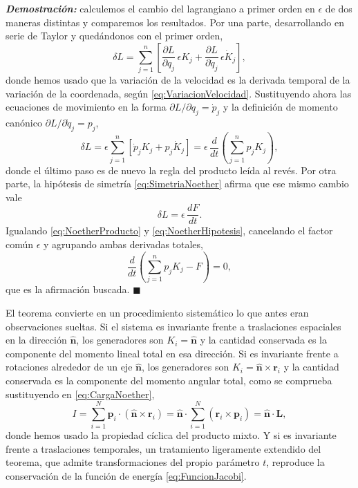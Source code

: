         \textbf{\textit{Demostración:}} calculemos el cambio del lagrangiano a primer orden en $\epsilon$ de dos maneras distintas y comparemos los resultados. Por una parte, desarrollando en serie de Taylor y quedándonos con el primer orden,
        \begin{equation}\label{eq:NoetherTaylor}
            \delta L = \sum_{j=1}^{n}\left[\frac{\partial L}{\partial q_{j}}\,\epsilon K_{j} + \frac{\partial L}{\partial\dot{q}_{j}}\,\epsilon\dot{K}_{j}\right],
        \end{equation}
        donde hemos usado que la variación de la velocidad es la derivada temporal de la variación de la coordenada, según \eqref{eq:VariacionVelocidad}. Sustituyendo ahora las ecuaciones de movimiento en la forma $\partial L/\partial q_{j} = \dot{p}_{j}$ y la definición de momento canónico $\partial L/\partial\dot{q}_{j} = p_{j}$,
        \begin{equation}\label{eq:NoetherProducto}
            \delta L = \epsilon\sum_{j=1}^{n}\left[\dot{p}_{j}K_{j} + p_{j}\dot{K}_{j}\right] = \epsilon\,\frac{d}{dt}\left(\sum_{j=1}^{n}p_{j}K_{j}\right),
        \end{equation}
        donde el último paso es de nuevo la regla del producto leída al revés. Por otra parte, la hipótesis de simetría \eqref{eq:SimetriaNoether} afirma que ese mismo cambio vale
        \begin{equation}\label{eq:NoetherHipotesis}
            \delta L = \epsilon\,\frac{dF}{dt} .
        \end{equation}
        Igualando \eqref{eq:NoetherProducto} y \eqref{eq:NoetherHipotesis}, cancelando el factor común $\epsilon$ y agrupando ambas derivadas totales,
        \begin{equation}\label{eq:NoetherFinal}
            \frac{d}{dt}\left(\sum_{j=1}^{n}p_{j}K_{j} - F\right) = 0,
        \end{equation}
        que es la afirmación buscada. $\blacksquare$

        El teorema convierte en un procedimiento sistemático lo que antes eran observaciones sueltas. Si el sistema es invariante frente a traslaciones espaciales en la dirección $\hat{\mathbf{n}}$, los generadores son $K_{i} = \hat{\mathbf{n}}$ y la cantidad conservada es la componente del momento lineal total en esa dirección. Si es invariante frente a rotaciones alrededor de un eje $\hat{\mathbf{n}}$, los generadores son $K_{i} = \hat{\mathbf{n}}\times\mathbf{r}_{i}$ y la cantidad conservada es la componente del momento angular total, como se comprueba sustituyendo en \eqref{eq:CargaNoether},
        \begin{equation}\label{eq:MomentoAngular}
            I = \sum_{i=1}^{N}\mathbf{p}_{i}\cdot\left(\hat{\mathbf{n}}\times\mathbf{r}_{i}\right) = \hat{\mathbf{n}}\cdot\sum_{i=1}^{N}\left(\mathbf{r}_{i}\times\mathbf{p}_{i}\right) = \hat{\mathbf{n}}\cdot\mathbf{L},
        \end{equation}
        donde hemos usado la propiedad cíclica del producto mixto. Y si es invariante frente a traslaciones temporales, un tratamiento ligeramente extendido del teorema, que admite transformaciones del propio parámetro $t$, reproduce la conservación de la función de energía \eqref{eq:FuncionJacobi}.

